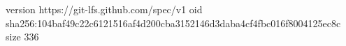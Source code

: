 version https://git-lfs.github.com/spec/v1
oid sha256:104baf49c22c6121516af4d200cba3152146d3daba4cf4fbc016f8004125ec8c
size 336
